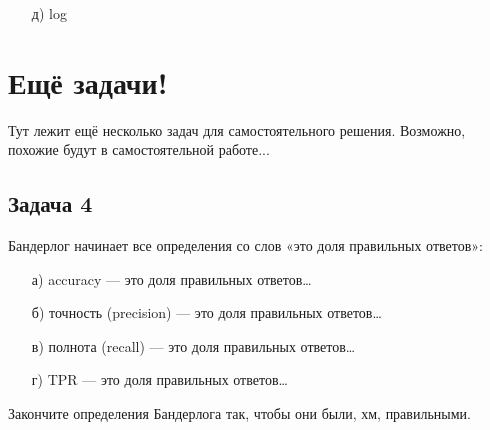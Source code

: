\documentclass[12pt, a4paper, oneside]{article}
\begin{document}
{\begin{enumerate}
		\[TPR = \frac{TP}{TP +FN} \qquad FPR = \frac{FP}{FP +TN}, \]
		
		перебирать порог и в осях, соответсвующих $TPR$ и $FPR$ отмечать точки. В итоге получится ровно такая же кривая как у нас. Именно такое определение вы встретите в большинстве курсов по ML. Но любой нормальный человек сразу же забывает что означают эти $FPRFRTPRPR$, поэтому мы так делать не будем. 
		
		Единственный профит от такого определения в том, что сразу же видно, что roc-auc устройчив к дисбалансу в классах. 
		
		\item[д)]  log 
		
	\end{enumerate}
}



\section*{Ещё задачи!}

Тут лежит ещё несколько задач для самостоятельного решения. Возможно, похожие будут в самостоятельной работе... 

\subsection*{Задача 4}

Бандерлог начинает все определения со слов «это доля правильных ответов»:
\begin{enumerate}
	\item[а)] accuracy — это доля правильных ответов\ldots
	\item[б)] точность (precision) — это доля правильных ответов\ldots
	\item[в)] полнота (recall) — это доля правильных ответов\ldots
	\item[г)] TPR — это доля правильных ответов\ldots
\end{enumerate}

Закончите определения Бандерлога так, чтобы они были, хм, правильными.

\end{document}
